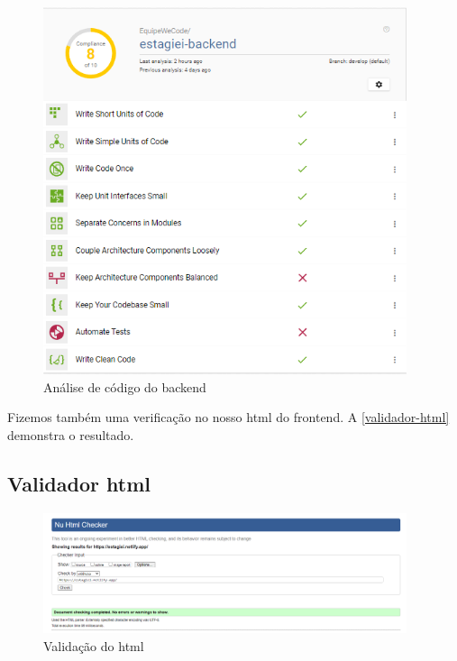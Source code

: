 \begin{figure}[H]
	\centering
	\caption{\label{better-code-back}Análise de código do \gls{backend}}
	\includegraphics[width=0.95\textwidth]{../imagens/web-tests/better-code-back.png}
\end{figure}

Fizemos também uma verificação no nosso \ac{html} do \ac{frontend}. A \autoref{validador-html} demonstra o resultado.

\subsection{Validador \ac{html}}
\begin{figure}[H]
	\centering
	\caption{\label{validador-html}Validação do \ac{html}}
	\includegraphics[width=0.95\textwidth]{../imagens/web-tests/validador-html.png}
\end{figure}


